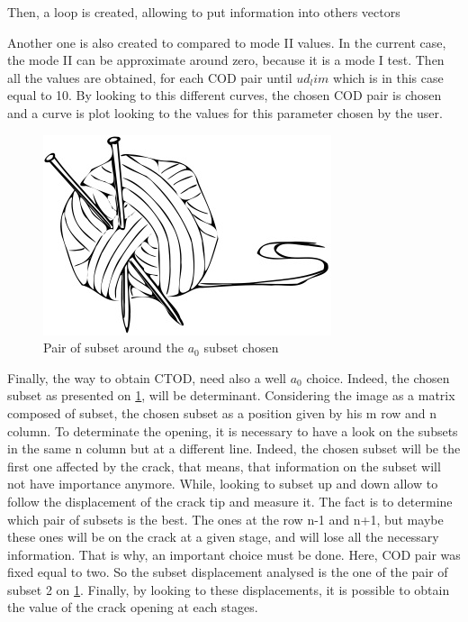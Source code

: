 \documentclass[3p,times,procedia]{elsarticle}
\begin{document}
Then, a loop is created, allowing to put information into others vectors

Another one is also created to compared to mode II values. In the current case, the mode II can be approximate around zero, because it is a mode I test. Then all the values are obtained, for each COD pair until $ud_lim$ which is in this case equal to 10. By looking to this different curves, the chosen COD pair is chosen and a curve is plot looking to the values for this parameter chosen by the user. 

\begin{figure}[h]
	\centering
	\includegraphics[scale=0.7]{Figures/example}
	\caption[Subset choice and pair of subset around]{Pair of subset around the $a_{0}$ subset chosen}
	\label{fig:subest_chosen}
\end{figure}

Finally, the way to obtain CTOD, need also a well $a_{0}$ choice. Indeed, the chosen subset as presented on \ref{fig:subest_chosen}, will be determinant. Considering the image as a matrix composed of subset, the chosen subset as a position given by his m row and n column. To determinate the opening, it is necessary to have a look on the subsets in the same n column but at a different line. Indeed, the chosen subset will be the first one affected by the crack, that means, that information on the subset will not have importance anymore. While, looking to subset up and down allow to follow the displacement of the crack tip and measure it. The fact is to determine which pair of subsets is the best. The ones at the row n-1 and n+1, but maybe these ones will be on the crack at a given stage, and will lose all the necessary information. That is why, an important choice must be done. Here, COD pair was fixed equal to two. So the subset displacement analysed is the one of the pair of subset 2 on \ref{fig:subest_chosen}. Finally, by looking to these displacements, it is possible to obtain the value of the crack opening at each stages.
\end{document}
